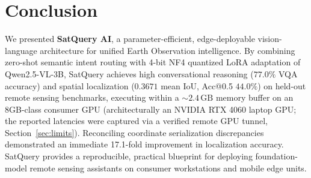 \documentclass[lettersize,journal]{IEEEtran}
\begin{document}
\section{Conclusion}
We presented \textbf{SatQuery AI}, a parameter-efficient, edge-deployable vision-language architecture for unified Earth Observation intelligence. By combining zero-shot semantic intent routing with 4-bit NF4 quantized LoRA adaptation of Qwen2.5-VL-3B, SatQuery achieves high conversational reasoning ($77.0\%$ VQA accuracy) and spatial localization ($0.3671$ mean IoU, Acc@0.5 $44.0\%$) on held-out remote sensing benchmarks, executing within a $\sim 2.4\,\text{GB}$ memory buffer on an 8GB-class consumer GPU (architecturally an NVIDIA RTX 4060 laptop GPU; the reported latencies were captured via a verified remote GPU tunnel, Section~\ref{sec:limits}). Reconciling coordinate serialization discrepancies demonstrated an immediate 17.1-fold improvement in localization accuracy. SatQuery provides a reproducible, practical blueprint for deploying foundation-model remote sensing assistants on consumer workstations and mobile edge units.



\end{document}

